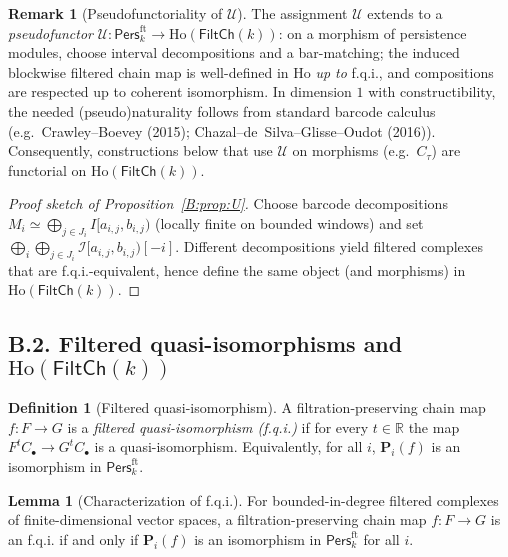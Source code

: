 \documentclass[11pt]{article}
\numberwithin{equation}{section}
\theoremstyle{plain}
\theoremstyle{definition}
\theoremstyle{remark}
\newcommand{\Pers}{\mathsf{Pers}}
\newcommand{\Ho}{\mathrm{Ho}}
\theoremstyle{plain}
\theoremstyle{definition}
\numberwithin{equation}{section}
\newtheorem{lemma}[theorem]{Lemma}
\theoremstyle{definition}
\newtheorem{definition}[theorem]{Definition}
\newtheorem{remark}[theorem]{Remark}
\numberwithin{equation}{section}
\theoremstyle{plain}
\theoremstyle{definition}
\theoremstyle{remark}
\begin{document}
\begin{remark}[Pseudofunctoriality of \(\mathcal{U}\)]
The assignment \(\mathcal{U}\) extends to a \emph{pseudofunctor}
\(\mathcal{U}:\Pers^{\mathrm{ft}}_k\to \Ho(\mathsf{FiltCh}(k))\): on a morphism of persistence modules, choose interval decompositions and a bar-matching; the induced blockwise filtered chain map is well-defined in \(\Ho\) \emph{up to} f.q.i., and compositions are respected up to coherent isomorphism.
In dimension \(1\) with constructibility, the needed (pseudo)naturality follows from standard barcode calculus (e.g.\ Crawley--Boevey (2015); Chazal--de~Silva--Glisse--Oudot (2016)).
Consequently, constructions below that use \(\mathcal{U}\) on morphisms (e.g.\ \(C_\tau\)) are functorial on \(\Ho(\mathsf{FiltCh}(k))\).
\end{remark}

\begin{proof}[Proof sketch of Proposition~\ref{B:prop:U}]
Choose barcode decompositions \(M_i\simeq \bigoplus_{j\in J_i} I[a_{i,j},b_{i,j})\) (locally finite on bounded windows) and set
\(\bigoplus_{i}\bigoplus_{j\in J_i}\mathcal{I}[a_{i,j},b_{i,j})[-i]\).
Different decompositions yield filtered complexes that are f.q.i.-equivalent, hence define the same object (and morphisms) in \(\Ho(\mathsf{FiltCh}(k))\).
\end{proof}

\subsection*{B.2. Filtered quasi-isomorphisms and \texorpdfstring{$\Ho(\mathsf{FiltCh}(k))$}{Ho(FiltCh(k))}}
\begin{definition}[Filtered quasi-isomorphism]
A filtration-preserving chain map \(f:F\to G\) is a \emph{filtered quasi-isomorphism (f.q.i.)} if for every \(t\in\mathbb{R}\) the map \(F^{t}C_\bullet\to G^{t}C_\bullet\) is a quasi-isomorphism.
Equivalently, for all \(i\), \(\mathbf{P}_i(f)\) is an isomorphism in \(\Pers^{\mathrm{ft}}_k\).
\end{definition}

\begin{lemma}[Characterization of f.q.i.]
For bounded-in-degree filtered complexes of finite-dimensional vector spaces, a filtration-preserving chain map \(f:F\to G\) is an f.q.i. if and only if \(\mathbf{P}_i(f)\) is an isomorphism in \(\Pers^{\mathrm{ft}}_k\) for all \(i\).
\end{lemma}
\end{document}

